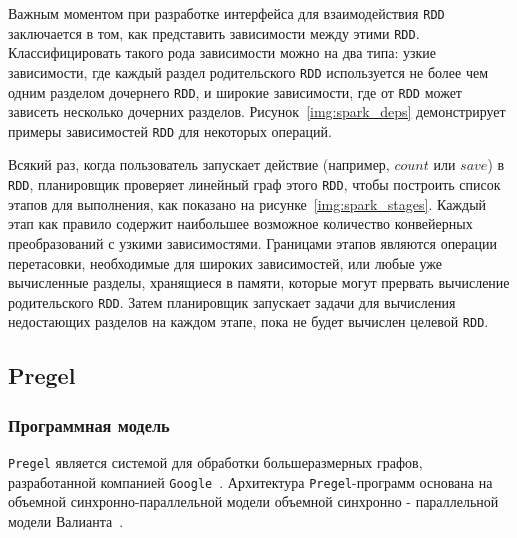 
Важным моментом при разработке интерфейса для взаимодействия \texttt{RDD} заключается в том, как представить зависимости между этими \texttt{RDD}.
Классифицировать такого рода зависимости можно на два типа: узкие зависимости, где каждый раздел родительского \texttt{RDD} используется не более чем одним разделом дочернего \texttt{RDD}, и широкие зависимости, где от \texttt{RDD} может зависеть несколько дочерних разделов.
Рисунок~\ref{img:spark_deps} демонстрирует примеры зависимостей \texttt{RDD} для некоторых операций.


Всякий раз, когда пользователь запускает действие (например, $count$ или $save$) в \texttt{RDD}, планировщик проверяет линейный граф этого \texttt{RDD}, чтобы построить список этапов для выполнения, как показано на рисунке~\ref{img:spark_stages}.
Каждый этап как правило содержит наибольшее возможное количество конвейерных преобразований с узкими зависимостями.
Границами этапов являются операции перетасовки, необходимые для широких зависимостей, или любые уже вычисленные разделы, хранящиеся в памяти, которые могут прервать вычисление родительского \texttt{RDD}. 
Затем планировщик запускает задачи для вычисления недостающих разделов на каждом этапе, пока не будет вычислен целевой \texttt{RDD}.


\subsection{Pregel}

\subsubsection{Программная модель}

\texttt{Pregel} является системой для обработки большеразмерных графов, разработанной компанией \texttt{Google}~\cite{6425724}.
Архитектура \texttt{Pregel}-программ основана на объемной синхронно-параллельной модели объемной синхронно - параллельной модели Валианта~\cite{Valiant1990ABM}. 

